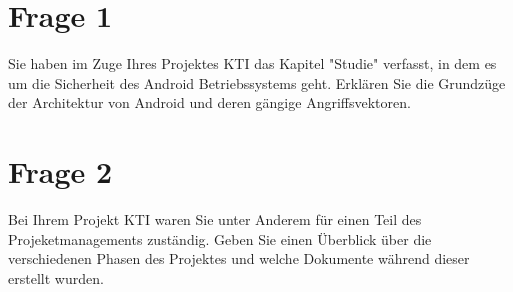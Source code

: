 \documentclass[a4paper, twopage]{scrreprt}
\begin{document}
\section{Frage 1}
Sie haben im Zuge Ihres Projektes KTI das Kapitel "Studie" verfasst, in dem es um die Sicherheit des Android Betriebssystems geht. Erklären Sie die Grundzüge der Architektur von Android und deren gängige Angriffsvektoren.
\section{Frage 2}
Bei Ihrem Projekt KTI waren Sie unter Anderem für einen Teil des Projeketmanagements zuständig. Geben Sie einen Überblick über die verschiedenen Phasen des Projektes und welche Dokumente während dieser erstellt wurden.

\nocite{*}
\printbibliography

\listoffigures
\end{document}
